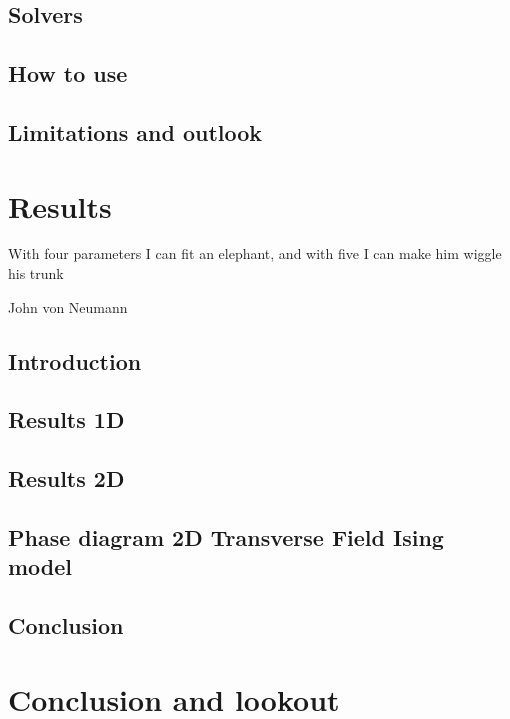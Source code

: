 \documentclass{book}
\newcommand*\cleartoleftpage{%
  \clearpage
  \ifodd\value{page} \thispagestyle{empty}\hbox{}\newpage\fi
}
\newcounter{a}
\newcounter{b}
\begin{document}
\section{Solvers} \label{sec:framework_impl}


\section{How to use}\label{sec:H5:source_code}


\section{Limitations and outlook}


\chapter{Results} \label{chap:results}

\epigraph{With four parameters I can fit an elephant, and with five I can make him wiggle his trunk}{John von Neumann}

%

\section{Introduction}


\section{Results 1D}\label{sec:results1d}


\section{Results 2D}\label{sec:results2d}


\section{Phase diagram 2D Transverse Field Ising model} \label{subsec:2dpahsediag}


\section{Conclusion}


\chapter{Conclusion and lookout}\label{Chap7}


\clearpage
{}




\cleartoleftpage
\end{document}
